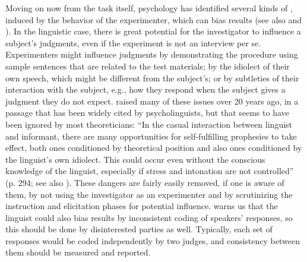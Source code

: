  Moving on now from the task itself, psychology has identified several kinds of , induced by the behavior of the experimenter, which can bias results (see also \citet{Labov1975} and \citet{Greenbaum1988}). In the linguistic case, there is great potential for the investigator to influence a subject's judgments, even if the experiment is not an interview per se. Experimenters might influence judgments by demonstrating the procedure using sample sentences that are related to the test materials; by the idiolect of their own speech, which might be different from the subject's; or by subtleties of their interaction with the subject, e.g., how they respond when the subject gives a judgment they do not expect. \citet{Heringer1970} raised many of these issues over 20 years ago, in a passage that has been
 widely cited by psycholinguists, but that seems to have been ignored by most theoreticians: ``In the casual interaction between linguist and informant, there are many opportunities for self-fulfilling prophesies to take effect, both ones conditioned by theoretical position and also ones conditioned by the linguist's own idiolect. This could occur even without the conscious knowledge of the linguist, especially if stress and intonation are not controlled'' (p. 294; see also \citealt{BradacEtAl1980}). These dangers are fairly easily removed, if one is aware of them, by not using the investigator as an experimenter and by scrutinizing the instruction and elicitation phases for potential influence. \citet{Carden1970a} warns us that the linguist could also bias results by inconsistent coding of speakers' responses, so this should be done by disinterested parties as well. Typically, each set of responses would be coded independently by two judges, and consistency between them should be measured and reported.

